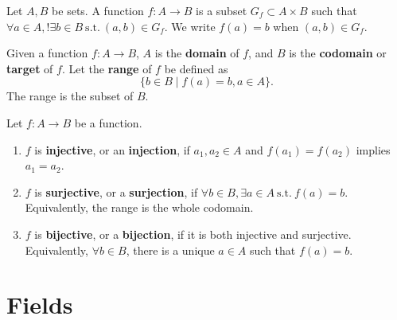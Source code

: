 \documentclass[math0540-lecture-notes.tex]{subfiles}
\begin{document}
\begin{definition}[Functions]{}
  Let $A, B$ be sets. A function $f: A \to B$ is a subset $G_f\subset A\times B$ such that $\forall
  a\in A, !\exists b\in B~\text{s.t.}~\left( a,b \right) \in G_f$. We write $f(a)=b$ when  $\left(
  a, b \right) \in G_f$.
\end{definition}
\begin{definition}[Codomain]{} 
  Given a function $ f: A \to B$, $A$ is the \textbf{domain} of $f$, and $B$ is the
  \textbf{codomain} or \textbf{target} of $f$. Let the \textbf{range} of $f$ be defined as \[
    \{b\in B\mid f(a) = b, a\in A\}
  .\] The range is the subset of $B$.
\end{definition}



\begin{definition}[Bijectivity]{}
  Let $ f: A \to B$ be a function.
  \begin{enumerate}
    \item $f$ is \textbf{injective}, or an \textbf{injection}, if $ a_1,a_2\in A$ and $f(a_1)
      = f(a_2) $ implies $ a_1=a_2$.
    \item $f$ is \textbf{surjective}, or a \textbf{surjection}, if $\forall b\in B, \exists a\in
      A~\text{s.t.}~f(a)=b$. Equivalently, the range is the whole codomain.
    \item $f$ is \textbf{bijective}, or a \textbf{bijection}, if it is both injective and
      surjective. Equivalently,  $\forall b\in B$, there is a unique $a\in A $ such that $f(a)=b$.
  \end{enumerate}
\end{definition}

\section{Fields}
\end{document}
